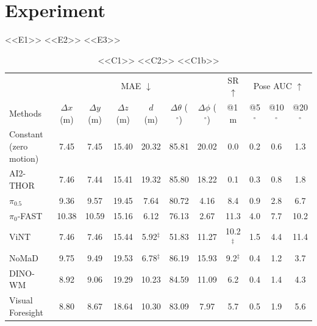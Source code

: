 \section{Experiment}
\label{others}

<<E1>> <<E2>> <<E3>>

\begin{table}[!t]
    \centering
    \caption{<<C1>> <<C2>> <<C1b>>}
    \label{tab:main_result}
    \small
    \setlength{\tabcolsep}{4.2pt}
    \begin{tabular}{l|cccccc|c|ccc}
        \toprule
        & \multicolumn{6}{c|}{MAE $\downarrow$} & SR $\uparrow$ & \multicolumn{3}{c}{Pose AUC $\uparrow$} \\
        Methods & $\Delta x$ (m) & $\Delta y$ (m) & $\Delta z$ (m) & $d$ (m) & $\Delta\theta$ ($^\circ$) & $\Delta\phi$ ($^\circ$) & @1\,m & @5$^\circ$ & @10$^\circ$ & @20$^\circ$ \\
        \midrule
        Constant (zero motion) & 7.45 & 7.45 & 15.40 & 20.32 & 85.81 & 20.02 & 0.0 & 0.2 & 0.6 & 1.3 \\
        \midrule
        AI2-THOR~\citep{7989381} & 7.46 & 7.44 & 15.41 & 19.32 & 85.80 & 18.22 & 0.1 & 0.3 & 0.8 & 1.8 \\
        $\pi_{0.5}$~\citep{intelligence2025pi_} & 9.36 & 9.57 & 19.45 & 7.64 & 80.72 & 4.16 & 8.4 & 0.9 & 2.8 & 6.7 \\
        $\pi_0$-FAST~\citep{pertsch2025fast} & 10.38 & 10.59 & 15.16 & 6.12 & 76.13 & 2.67 & 11.3 & 4.0 & 7.7 & 10.2 \\
        ViNT~\citep{shah2023vint} & 7.46 & 7.46 & 15.44 & 5.92$^\ddagger$ & 51.83 & 11.27 & 10.2$^\ddagger$ & 1.5 & 4.4 & 11.4 \\
        NoMaD~\citep{sridhar2024nomad} & 9.75 & 9.49 & 19.53 & 6.78$^\ddagger$ & 86.19 & 15.93 & 9.2$^\ddagger$ & 0.4 & 1.2 & 3.7 \\
        DINO-WM~\citep{zhou2025dinowm} & 8.92 & 9.06 & 19.29 & 10.23 & 84.59 & 11.09 & 6.2 & 0.4 & 1.4 & 4.3 \\
        Visual Foresight~\citep{ebert2018visual} & 8.80 & 8.67 & 18.64 & 10.30 & 83.09 & 7.97 & 5.7 & 0.5 & 1.9 & 5.6 \\

\end{tabular}
\end{table}
